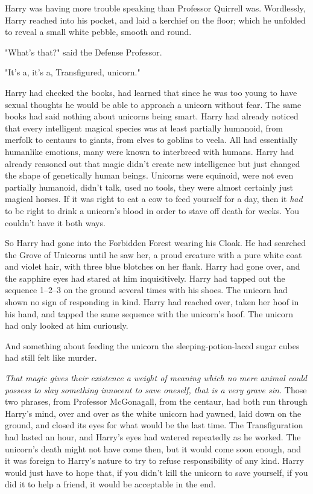 Harry was having more trouble speaking than Professor Quirrell was. Wordlessly,
Harry reached into his pocket, and laid a kerchief on the floor; which he
unfolded to reveal a small white pebble, smooth and round.

"What's that?" said the Defense Professor.

"It's a, it's a, Transfigured, unicorn."

Harry had checked the books, had learned that since he was too young to have
sexual thoughts he would be able to approach a unicorn without fear. The same
books had said nothing about unicorns being smart. Harry had already noticed
that every intelligent magical species was at least partially humanoid, from
merfolk to centaurs to giants, from elves to goblins to veela. All had
essentially humanlike emotions, many were known to interbreed with humans.
Harry had already reasoned out that magic didn't create new intelligence but
just changed the shape of genetically human beings. Unicorns were equinoid,
were not even partially humanoid, didn't talk, used no tools, they were almost
certainly just magical horses. If it was right to eat a cow to feed yourself
for a day, then it \emph{had} to be right to drink a unicorn's blood in order
to stave off death for weeks. You couldn't have it both ways.

So Harry had gone into the Forbidden Forest wearing his Cloak. He had searched
the Grove of Unicorns until he saw her, a proud creature with a pure white coat
and violet hair, with three blue blotches on her flank. Harry had gone over,
and the sapphire eyes had stared at him inquisitively. Harry had tapped out the
sequence 1--2--3 on the ground several times with his shoes. The unicorn had
shown no sign of responding in kind. Harry had reached over, taken her hoof in
his hand, and tapped the same sequence with the unicorn's hoof. The unicorn had
only looked at him curiously.

And something about feeding the unicorn the sleeping-potion-laced sugar cubes
had still felt like murder.

\emph{That magic gives their existence a weight of meaning which no mere animal
could possess{\el} to slay something innocent to save oneself, that is a
very grave sin.} Those two phrases, from Professor McGonagall, from the
centaur, had both run through Harry's mind, over and over as the white unicorn
had yawned, laid down on the ground, and closed its eyes for what would be the
last time. The Transfiguration had lasted an hour, and Harry's eyes had watered
repeatedly as he worked. The unicorn's death might not have come then, but it
would come soon enough, and it was foreign to Harry's nature to try to refuse
responsibility of any kind. Harry would just have to hope that, if you didn't
kill the unicorn to save yourself, if you did it to help a friend, it would be
acceptable in the end.

